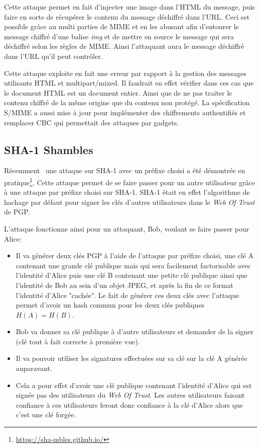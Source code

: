 Cette attaque permet en fait d'injecter une image dans l'HTML du message, puis faire en sorte de récupérer le contenu du message déchiffré dans l'URL. Ceci est possible grâce au multi parties de MIME et en les abusant afin d'entourer le message chiffré d'une balise \textit{img} et de mettre en source le message qui sera déchiffré selon les règles de MIME. Ainsi l'attaquant aura le message déchiffré dans l'URL qu'il peut contrôler. 

Cette attaque exploite en fait une erreur par rapport à la gestion des messages utilisants HTML et multipart/mixed. Il faudrait en effet vérifier dans ces cas que le document HTML est un document entier. Ainsi que de ne pas traiter le contenu chiffré de la même origine que du contenu non protégé. La spécification~\cite{RFC8551} S/MIME a aussi mise à jour pour implémenter des chiffrements authentifiés et remplacer CBC qui permettait des attaques par gadgets.
\subsection{SHA-1 Shambles}
Récemment~\cite{journals/iacr/LeurentP20} une attaque sur SHA-1 avec un préfixe choisi a été démontrée en pratique\footnote{\url{https://sha-mbles.github.io/}}. Cette attaque permet de se faire passer pour un autre utilisateur grâce à une attaque par préfixe choisi sur SHA-1. SHA-1 était en effet l'algorithme de hachage par défaut pour signer les clés d'autres utilisateurs dans le \textit{Web Of Trust} de PGP.

L'attaque fonctionne ainsi pour un attaquant, Bob, voulant se faire passer pour Alice: 
\begin{itemize}
	\item Il va générer deux clés PGP à l'aide de l'attaque par préfixe choisi, une clé A contenant une grande clé publique mais qui sera facilement factorisable avec l'identité d'Alice puis une clé B contenant une petite clé publique ainsi que l'identité de Bob au sein d'un objet JPEG, et après la fin de ce format l'identité d'Alice "cachée". Le fait de générer ces deux clés avec l'attaque permet d'avoir un hash commun pour les deux clés publiques $H(A) = H(B)$.
	\item Bob va donner sa clé publique à d'autre utilisateurs et demander de la signer (clé tout à fait correcte à première vue).
	\item Il va pouvoir utiliser les signatures effectuées sur sa clé sur la clé A générée auparavant.
	\item Cela a pour effet d'avoir une clé publique contenant l'identité d'Alice qui est signée pas des utilisateurs du \textit{Web Of Trust}. Les autres utilisateurs faisant confiance à ces utilisateurs feront donc confiance à la clé d'Alice alors que c'est une clé forgée.
\end{itemize}
